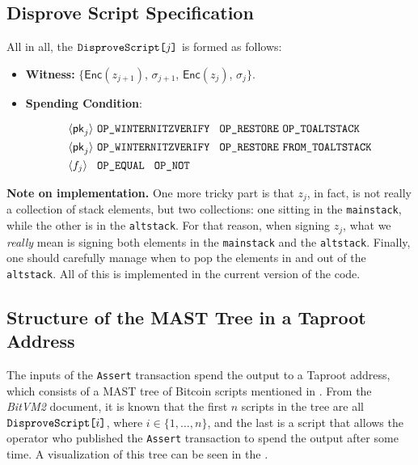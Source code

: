 \documentclass{iacrtrans}
\newcommand{\elem}[1]{\, \langle #1 \rangle \,}
\newcommand{\opcode}[1]{\, \texttt{#1} \,}
\begin{document}
\subsection{Disprove Script Specification}

All in all, the $\texttt{DisproveScript[\text{$j$}]}$ is formed as follows:
\begin{itemize}
  \item \textbf{Witness:} $\Big\{\mathsf{Enc}(z_{j+1})$, $\sigma_{j+1}$, $\mathsf{Enc}(z_{j})$, $\sigma_j\Big\}$.
  \item \textbf{Spending Condition}:
  \begin{empheqboxed}
    \begin{align*}
      &\elem{\mathsf{pk}_j} \opcode{\texttt{OP\_WINTERNITZVERIFY} } \opcode{\texttt{OP\_RESTORE}} \opcode{\texttt{OP\_TOALTSTACK}} \\
      &\elem{\mathsf{pk}_{j}} \opcode{\texttt{OP\_WINTERNITZVERIFY} } \opcode{\texttt{OP\_RESTORE}} \opcode{\texttt{FROM\_TOALTSTACK}} \\
      &\elem{f_j} \opcode{ \texttt{OP\_EQUAL} } \opcode{\texttt{OP\_NOT}}
    \end{align*}
  \end{empheqboxed}
\end{itemize}

\textbf{Note on implementation.} One more tricky part is that $z_j$, in fact, is
not really a collection of stack elements, but two collections: one sitting in
the \texttt{mainstack}, while the other is in the \texttt{altstack}. For that
reason, when signing $z_j$, what we \textit{really} mean is signing both
elements in the \texttt{mainstack} and the \texttt{altstack}. Finally, one
should carefully manage when to pop the elements in and out of the
\texttt{altstack}. All of this is implemented in the current version of the
code.

\subsection{Structure of the MAST Tree in a Taproot
Address}\label{sec:mast-tree-structure}

The inputs of the \texttt{Assert} transaction spend the output to a Taproot
address, which consists of a MAST tree of Bitcoin scripts mentioned in
. From the \textit{BitVM2} document, it is known that the first \(n\)
scripts in the tree are all \(\texttt{DisproveScript[\text{$i$}]}\), where \(i
\in \{1,\dots, n\}\), and the last is a script that allows the operator who
published the \texttt{Assert} transaction to spend the output after some time. A
visualization of this tree can be seen in the .
\end{document}
